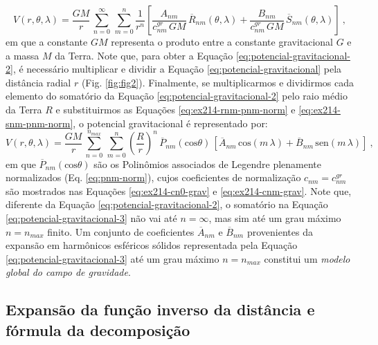 \documentclass[10pt,a4paper,fleqn]{article}
\begin{document}
\begin{equation}
V(r, \theta, \lambda) = \frac{GM}{r} \, \sum_{n=0}^{\infty} \, \sum_{m=0}^{n} 
\frac{1}{r^{n}} \left[ 
\frac{A_{nm}}{c_{nm}^{gr} \, GM} \, \overline{R}_{nm}(\theta, \lambda) +
\frac{B_{nm}}{c_{nm}^{gr} \, GM} \, \overline{S}_{nm}(\theta, \lambda)
\right] \: ,
\label{eq:potencial-gravitacional-2}
\end{equation}
em que a constante $GM$ representa o produto entre a constante gravitacional $G$ 
e a massa $M$ da Terra. Note que, para obter a Equa\c{c}\~{a}o 
\ref{eq:potencial-gravitacional-2}, \'{e} necess\'{a}rio multiplicar e dividir 
a Equa\c{c}\~{a}o \ref{eq:potencial-gravitacional} pela dist\^{a}ncia radial $r$
(Fig. \ref{fig:fig2}).
Finalmente, se multiplicarmos e dividirmos cada elemento
do somat\'{o}rio da Equa\c{c}\~{a}o \ref{eq:potencial-gravitacional-2}
pelo raio m\'{e}dio da Terra $R$ e substituirmos as Equa\c{c}\~{o}es
\ref{eq:ex214-rnm-pnm-norm} e \ref{eq:ex214-snm-pnm-norm}, 
o potencial gravitacional \'{e} representado por:
\begin{equation}
V(r, \theta, \lambda) = \frac{GM}{r} \, 
\sum_{n=0}^{n_{max}} \, \sum_{m=0}^{n} 
\left(\frac{R}{r}\right)^{n} \, \overline{P}_{nm}(\text{cos}\theta) \, \left[ 
\overline{A}_{nm} \, \text{cos}(m \, \lambda) +
\overline{B}_{nm} \, \text{sen}(m \, \lambda)
\right] \: ,
\label{eq:potencial-gravitacional-3}
\end{equation}
em que $\overline{P}_{nm}(\text{cos}\theta)$ s\~{a}o os Polin\^{o}mios associados 
de Legendre plenamente normalizados (Eq. \ref{eq:pnm-norm}), cujos
coeficientes de normaliza\c{c}\~{a}o $c_{nm} = c_{nm}^{gr}$ s\~{a}o mostrados
nas Equa\c{c}\~{o}es \ref{eq:ex214-cn0-grav} e \ref{eq:ex214-cnm-grav}.
Note que, diferente da Equa\c{c}\~{a}o \ref{eq:potencial-gravitacional-2},
o somat\'{o}rio na Equa\c{c}\~{a}o \ref{eq:potencial-gravitacional-3}
n\~{a}o vai at\'{e} $n = \infty$, mas sim at\'{e} um grau m\'{a}ximo 
$n = n_{max}$ finito.
Um conjunto de coeficientes $\overline{A}_{nm}$ e $\overline{B}_{nm}$
provenientes da expans\~{a}o em harm\^{o}nicos esf\'{e}ricos 
s\'{o}lidos representada pela Equa\c{c}\~{a}o \ref{eq:potencial-gravitacional-3}
at\'{e} um grau m\'{a}ximo $n = n_{max}$ constitui um \textit{modelo global do
campo de gravidade}.

\subsection{Expans\~{a}o da fun\c{c}\~{a}o inverso da dist\^{a}ncia e f\'{o}rmula 
da decomposi\c{c}\~{a}o}
\end{document}
